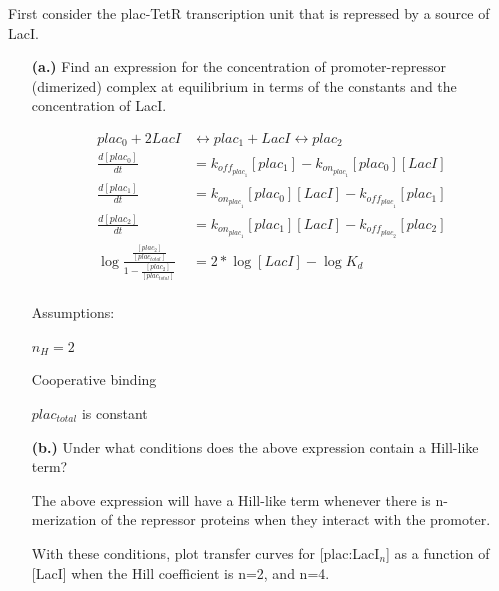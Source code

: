 \documentclass[11pt]{article}
\begin{document}
First consider the plac-TetR transcription unit that is repressed by a source of LacI.
\begin{itemize}

\item[{\bf (a.)}] Find an expression for the concentration of promoter-repressor (dimerized) complex at equilibrium in terms of the constants and the concentration of LacI.

\begin{equation*}
  \begin{align}
    plac_0 + 2LacI &\leftrightarrow plac_1 + LacI \leftrightarrow plac_2\\
    \frac{d[plac_0]}{dt} &= 
    k_{off_{{plac}_1}}[plac_1] - k_{on_{{plac}_1}}[plac_0][LacI] \\
    \frac{d[plac_1]}{dt} &= 
    k_{on_{{plac}_1}}[plac_0][LacI] - k_{off_{{plac}_1}}[plac_1]\\
    \frac{d[plac_2]}{dt} &= 
    k_{on_{{plac}_1}}[plac_1][LacI] - k_{off_{{plac}_2}}[plac_2]\\
    \log{\frac{\frac{[plac_2]}{[plac_{total}]}}{1-\frac{[plac_2]}{[plac_{total}]}}} &=
    2 * \log{[LacI]}-\log{K_d}\\
  \end{align}
\end{equation*}

Assumptions: 

$n_H = 2$

Cooperative binding 

$plac_{total}$ is constant



\item[{\bf (b.)}] Under what conditions does the above expression contain a Hill-like term?

The above expression will have a Hill-like term whenever there is n-merization of the repressor proteins when they interact with the promoter.
 
With these conditions, plot transfer curves for [plac:LacI$_n$] as a function of [LacI] when the Hill coefficient is n=2, and n=4.


{
 \centering
  }
\end{itemize}
\end{document}
